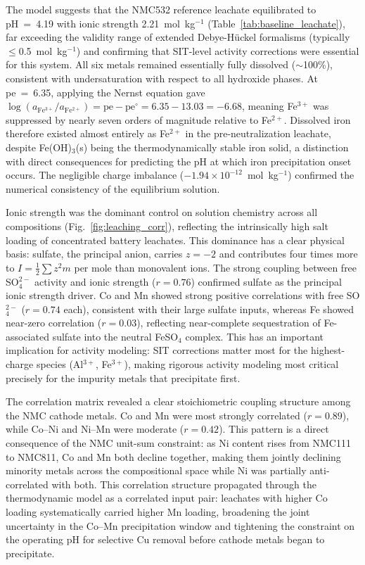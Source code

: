 \documentclass[final,2p,times]{elsarticle}
\begin{document}
The model suggests that the NMC532 reference leachate equilibrated to pH~=~4.19 with ionic strength 2.21~mol~kg$^{-1}$ (Table~\ref{tab:baseline_leachate}), far exceeding the validity range of extended Debye-H\"uckel formalisms (typically $\leq$0.5~mol~kg$^{-1}$) and confirming that SIT-level activity corrections were essential for this system. All six metals remained essentially fully dissolved (${\sim}$100\%), consistent with undersaturation with respect to all hydroxide phases. At pe~=~6.35, applying the Nernst equation gave $\log(a_{\mathrm{Fe^{3+}}}/a_{\mathrm{Fe^{2+}}}) = \mathrm{pe} - \mathrm{pe}^\circ = 6.35 - 13.03 = -6.68$, meaning Fe$^{3+}$ was suppressed by nearly seven orders of magnitude relative to Fe$^{2+}$. Dissolved iron therefore existed almost entirely as Fe$^{2+}$ in the pre-neutralization leachate, despite Fe(OH)$_3$(s) being the thermodynamically stable iron solid, a distinction with direct consequences for predicting the pH at which iron precipitation onset occurs. The negligible charge imbalance ($-1.94\times10^{-12}$~mol~kg$^{-1}$) confirmed the numerical consistency of the equilibrium solution.

Ionic strength was the dominant control on solution chemistry across all compositions (Fig.~\ref{fig:leaching_corr}), reflecting the intrinsically high salt loading of concentrated battery leachates. This dominance has a clear physical basis: sulfate, the principal anion, carries $z = -2$ and contributes four times more to $I = \tfrac{1}{2}\sum z^2 m$ per mole than monovalent ions. The strong coupling between free SO$_4^{2-}$ activity and ionic strength ($r = 0.76$) confirmed sulfate as the principal ionic strength driver. Co and Mn showed strong positive correlations with free SO$_4^{2-}$ ($r = 0.74$ each), consistent with their large sulfate inputs, whereas Fe showed near-zero correlation ($r = 0.03$), reflecting near-complete sequestration of Fe-associated sulfate into the neutral FeSO$_4$ complex. This has an important implication for activity modeling: SIT corrections matter most for the highest-charge species (Al$^{3+}$, Fe$^{3+}$), making rigorous activity modeling most critical precisely for the impurity metals that precipitate first.

The correlation matrix revealed a clear stoichiometric coupling structure among the NMC cathode metals. Co and Mn were most strongly correlated ($r = 0.89$), while Co--Ni and Ni--Mn were moderate ($r = 0.42$). This pattern is a direct consequence of the NMC unit-sum constraint: as Ni content rises from NMC111 to NMC811, Co and Mn both decline together, making them jointly declining minority metals across the compositional space while Ni was partially anti-correlated with both. This correlation structure propagated through the thermodynamic model as a correlated input pair: leachates with higher Co loading systematically carried higher Mn loading, broadening the joint uncertainty in the Co--Mn precipitation window and tightening the constraint on the operating pH for selective Cu removal before cathode metals began to precipitate.
\end{document}
